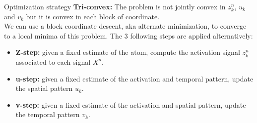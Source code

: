 \documentclass{beamer}
\begin{document}

\begin{frame}{Optimization strategy}
\textbf{Tri-convex:} The problem is not jointly convex in $z^n_k$, $u_k$ and $v_k$ but it is convex in each block of coordinate.\\[1em]

We can use a block coordinate descent, aka alternate minimization, to converge to a local minima of this problem. The 3 following steps are applied alternatively:

\begin{itemize}
	\item \textbf{Z-step:} given a fixed estimate of the atom, compute the activation signal $z^n_k$ associated to each signal $X^n$.
	\item \textbf{u-step:} given a fixed estimate of the activation and temporal pattern, update the spatial pattern $u_k$.
	\item \textbf{v-step:} given a fixed estimate of the activation and spatial pattern, update the temporal pattern $v_k$.
\end{itemize}
\end{frame}
\end{document}
